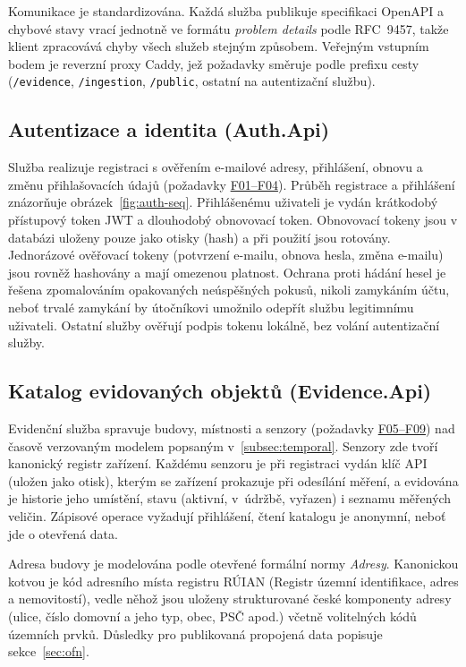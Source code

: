 Komunikace je standardizována. Každá služba publikuje specifikaci OpenAPI a chybové stavy vrací jednotně ve formátu \emph{problem details} podle RFC~9457, takže klient zpracovává chyby všech služeb stejným způsobem. Veřejným vstupním bodem je reverzní proxy Caddy, jež požadavky směruje podle prefixu cesty (\texttt{/evidence}, \texttt{/ingestion}, \texttt{/public}, ostatní na autentizační službu).

\subsection{Autentizace a identita (Auth.Api)}

Služba realizuje registraci s ověřením e-mailové adresy, přihlášení, obnovu a změnu přihlašovacích údajů (požadavky \hyperref[tab:funkcni-pozadavky]{F01--F04}). Průběh registrace a přihlášení znázorňuje obrázek~\ref{fig:auth-seq}. Přihlášenému uživateli je vydán krátkodobý přístupový token JWT a dlouhodobý obnovovací token. Obnovovací tokeny jsou v databázi uloženy pouze jako otisky (hash) a při použití jsou rotovány. Jednorázové ověřovací tokeny (potvrzení e-mailu, obnova hesla, změna e-mailu) jsou rovněž hashovány a mají omezenou platnost. Ochrana proti hádání hesel je řešena zpomalováním opakovaných neúspěšných pokusů, nikoli zamykáním účtu, neboť trvalé zamykání by útočníkovi umožnilo odepřít službu legitimnímu uživateli. Ostatní služby ověřují podpis tokenu lokálně, bez volání autentizační služby.



\subsection{Katalog evidovaných objektů (Evidence.Api)}

Evidenční služba spravuje budovy, místnosti a senzory (požadavky \hyperref[tab:funkcni-pozadavky]{F05--F09}) nad časově verzovaným modelem popsaným v~\ref{subsec:temporal}. Senzory zde tvoří kanonický registr zařízení. Každému senzoru je při registraci vydán klíč API (uložen jako otisk), kterým se zařízení prokazuje při odesílání měření, a evidována je historie jeho umístění, stavu (aktivní, v~údržbě, vyřazen) i seznamu měřených veličin. Zápisové operace vyžadují přihlášení, čtení katalogu je anonymní, neboť jde o otevřená data.

Adresa budovy je modelována podle otevřené formální normy \emph{Adresy}. Kanonickou kotvou je kód adresního místa registru RÚIAN (Registr územní identifikace, adres a nemovitostí), vedle něhož jsou uloženy strukturované české komponenty adresy (ulice, číslo domovní a jeho typ, obec, PSČ apod.) včetně volitelných kódů územních prvků. Důsledky pro publikovaná propojená data popisuje sekce~\ref{sec:ofn}.

